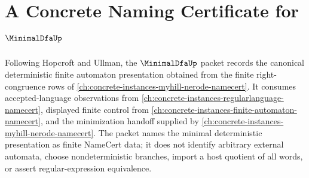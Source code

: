 \chapter{A Concrete Naming Certificate for $\MinimalDfaUp$}
\label{ch:concrete-instances-minimal-dfa-namecert}

Following Hopcroft and Ullman, the $\MinimalDfaUp$ packet records the canonical deterministic finite automaton presentation obtained from the finite right-congruence rows of \autoref{ch:concrete-instances-myhill-nerode-namecert}. It consumes accepted-language observations from \autoref{ch:concrete-instances-regularlanguage-namecert}, displayed finite control from \autoref{ch:concrete-instances-finite-automaton-namecert}, and the minimization handoff supplied by \autoref{ch:concrete-instances-myhill-nerode-namecert}. The packet names the minimal deterministic presentation as finite NameCert data; it does not identify arbitrary external automata, choose nondeterministic branches, import a host quotient of all words, or assert regular-expression equivalence.

